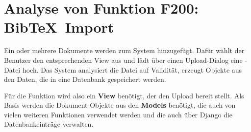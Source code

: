 \section{Analyse von Funktion F200: Bib\TeX\ Import}
Ein oder mehrere Dokumente werden zum System hinzugefügt. Dafür wählt der
Benutzer den entsprechenden View aus und lädt über einen Upload-Dialog eine
\BibTeX -Datei hoch. Das System analysiert die Datei auf Validität, erzeugt
Objekte aus den Daten, die in eine Datenbank gespeichert werden.

Für die Funktion wird also ein \textbf{View} benötigt, der den Upload bereit
stellt.  Als Basis werden die Dokument-Objekte aus den \textbf{Models} benötigt,
die auch von vielen weiteren Funktionen verwendet werden und die auch über
Django die Datenbankeinträge verwalten.
